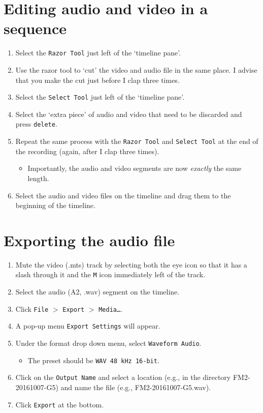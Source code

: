 \documentclass{article}
\begin{document}
\section*{Editing audio and video in a sequence}
\begin{enumerate}
  \item Select the \texttt{Razor Tool} just left of the `timeline pane'.
  \item Use the razor tool to `cut' the video and audio file in the same place. I advise that you make the cut just before I clap three times.
  \item Select the \texttt{Select Tool} just left of the `timeline pane'.
  \item Select the `extra piece' of audio and video that need to be discarded and press \texttt{delete}.
  \item Repeat the same process with the \texttt{Razor Tool} and \texttt{Select Tool} at the end of the recording (again, after I clap three times).
  \begin{itemize}
    \item Importantly, the audio and video segments are now \textit{exactly} the same length.
  \end{itemize}
  \item Select the audio and video files on the timeline and drag them to the beginning of the timeline.  
\end{enumerate}

\section*{Exporting the audio file}
\begin{enumerate}
  \item Mute the video (.mts) track by selecting both the eye icon so that it has a slash through it and the \texttt{M} icon immediately left of the track.
  \item Select the audio (A2, .wav) segment on the timeline.
  \item Click \texttt{File} $>$ \texttt{Export} $>$ \texttt{Media\ldots}.
  \item A pop-up menu \texttt{Export Settings} will appear.
  \item Under the format drop down menu, select \texttt{Waveform Audio}.
  \begin{itemize}
    \item The preset should be \texttt{WAV 48 kHz 16-bit}.
  \end{itemize}
  \item Click on the \texttt{Output Name} and select a location (e.g., in the directory FM2-20161007-G5) and name the file (e.g., FM2-20161007-G5.wav).
  \item Click \texttt{Export} at the bottom.
\end{enumerate}
\end{document}
